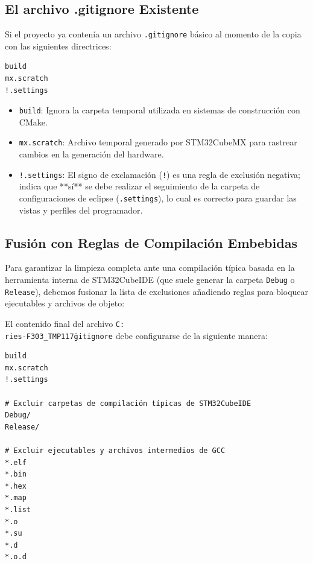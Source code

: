 \documentclass[
10pt, %
a4paper, %
oneside, %
headinclude,footinclude, %
BCOR5mm, %
]{scrartcl}
\begin{document}
\subsection{El archivo .gitignore Existente}
Si el proyecto ya contenía un archivo \texttt{.gitignore} básico al momento de la copia con las siguientes directrices:
\begin{lstlisting}[language=plaintext, style=miestiloclaro]
build
mx.scratch
!.settings
\end{lstlisting}

\begin{itemize}
	\item \texttt{build}: Ignora la carpeta temporal utilizada en sistemas de construcción con CMake.
	\item \texttt{mx.scratch}: Archivo temporal generado por STM32CubeMX para rastrear cambios en la generación del hardware.
	\item \texttt{!.settings}: El signo de exclamación (\texttt{!}) es una regla de exclusión negativa; indica que **sí** se debe realizar el seguimiento de la carpeta de configuraciones de eclipse (\texttt{.settings}), lo cual es correcto para guardar las vistas y perfiles del programador.
\end{itemize}

\subsection{Fusión con Reglas de Compilación Embebidas}
Para garantizar la limpieza completa ante una compilación típica basada en la herramienta interna de STM32CubeIDE (que suele generar la carpeta \texttt{Debug} o \texttt{Release}), debemos fusionar la lista de exclusiones añadiendo reglas para bloquear ejecutables y archivos de objeto:

El contenido final del archivo \texttt{C:\string\Users\string\casti\string\OneDrive\string\Documentos\string\GitHub\string\Libraries\string\Libra\\ries\string\C\string{}\string{}\string\NUCLEO-F303\_TMP117\string\.gitignore} debe configurarse de la siguiente manera:

\begin{lstlisting}[language=plaintext, style=miestiloclaro]
build
mx.scratch
!.settings

# Excluir carpetas de compilación típicas de STM32CubeIDE
Debug/
Release/

# Excluir ejecutables y archivos intermedios de GCC
*.elf
*.bin
*.hex
*.map
*.list
*.o
*.su
*.d
*.o.d
\end{lstlisting}
\end{document}
